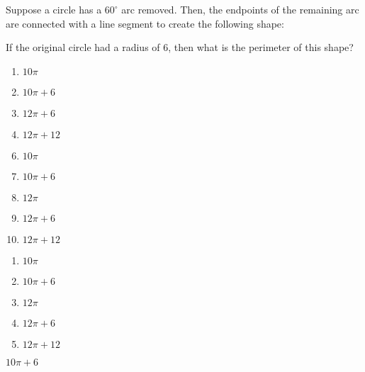 


 Suppose a circle has a $60^\circ$ arc removed.  Then, the endpoints of the remaining arc are connected with a line segment to create the following shape:

\begin{center}
\end{center}
If the original circle had a radius of 6, then what is the perimeter of this shape?



\ifsat
	\begin{enumerate}[label=\Alph*)]
		\item  $10 \pi$ 
		\item  $10\pi+6$ %
		\item  $12\pi+6$
		\item  $12\pi+12$
	\end{enumerate}
\else
\fi

\ifacteven
	\begin{enumerate}[label=\textbf{\Alph*.},itemsep=\fill,align=left]
		\setcounter{enumii}{5}
		\item  $10 \pi$ 
		\item  $10\pi+6$ %
		\item  $12\pi$ 
		\addtocounter{enumii}{1}
		\item  $12\pi+6$
		\item  $12\pi+12$
	\end{enumerate}
\else
\fi

\ifactodd
	\begin{enumerate}[label=\textbf{\Alph*.},itemsep=\fill,align=left]
		\item  $10 \pi$ 
		\item  $10\pi+6$ %
		\item  $12\pi$ 
		\item  $12\pi+6$
		\item  $12\pi+12$
	\end{enumerate}
\else
\fi

\ifgridin
  $10\pi+6$ %
		
\else
\fi

